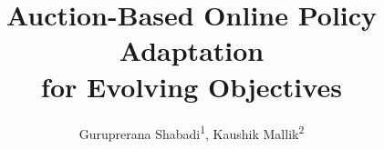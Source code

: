 \documentclass[10pt]{article} %
\title{Auction-Based Online Policy Adaptation\\for Evolving Objectives}
\author{Guruprerana Shabadi\textsuperscript{1}, Kaushik Mallik\textsuperscript{2}}
\begin{document}
\makeCover  %
\maketitle  %




%

%




\appendix




\FloatBarrier



\beginSupplementaryMaterials


\end{document}
